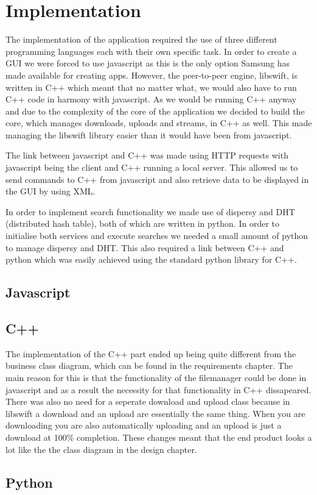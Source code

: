\chapter{Implementation}

The implementation of the application required the use of three different programming languages each with their own specific task. In order to create a GUI we were forced to use javascript as this is the only option Samsung has made available for creating apps. However, the peer-to-peer engine, libswift, is written in C++ which meant that no matter what, we would also have to run C++ code in harmony with javascript. As we would be running C++ anyway and due to the complexity of the core of the application we decided to build the core, which manages downloads, uploads and streams, in C++ as well. This made managing the libswift library easier than it would have been from javascript.

The link between javascript and C++ was made using HTTP requests with javascript being the client  and C++ running a local server. This allowed us to send commands to C++ from javascript and also retrieve data to be displayed in the GUI by using XML.

In order to implement search functionality we made use of dispersy and DHT (distributed hash table), both of which are written in python. In order to initialise both services and execute searches we needed a small amount of python to manage dispersy and DHT. This also required a link between C++ and python which was easily achieved using the standard python library for C++.

\section{Javascript}

\section{C++}

The implementation of the C++ part ended up being quite different from the business class diagram, which can be found in the requirements chapter. The main reason for this is that the functionality of the filemanager could be done in javascript and as a result the necessity for that functionality in C++ dissapeared. There was also no need for a seperate download and upload class because in libswift a download and an upload are essentially the same thing. When you are downloading you are also automatically uploading and an upload is just a download at 100\% completion. These changes meant that the end product looks a lot like the the class diagram in the design chapter.

\section{Python}

